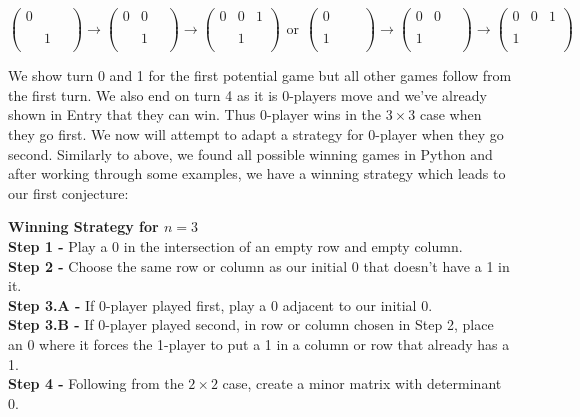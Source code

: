 \documentclass[11pt]{article}
\newcommand{\keywordfont}{\textsc}
\newcommand{\keyword}[1]{%
  \marginpar{\raggedright\small\keywordfont{#1}}}
\begin{document}
\[ \left( \begin{array}{ccc}
0 & \ & \ \\
\ & \ & \ \\
\ & 1 & \ \\
\end{array} \right)
\rightarrow
%
\left( \begin{array}{ccc}
0 & 0 & \ \\
\ & \ & \ \\
\ & 1 & \ \\
\end{array} \right)
\rightarrow
%
\left( \begin{array}{cc|c}
0 & 0 & 1 \\
\hline
\ & \ & \ \\
\ & 1 & \ \\
\end{array} \right)
\hspace{5pt} \text{or} \hspace{5pt}
%
\left( \begin{array}{ccc}
0 & \ & \ \\
\ & \ & \ \\
1 & \ & \ \\
\end{array} \right)
\rightarrow
%
\left( \begin{array}{ccc}
0 & 0 & \ \\
\ & \ & \ \\
1 & \ & \ \\
\end{array} \right)
\rightarrow
%
\left( \begin{array}{cc|c}
0 & 0 & 1 \\
\hline
\ & \ & \ \\
1 & \ & \ \\
\end{array} \right)
\]

We show turn 0 and 1 for the first potential game but all other games follow from the first turn. We also end on turn 4 as it is 0-players move and we've already shown in Entry that they can win. Thus 0-player wins in the $3 \times 3$ case when they go first. We now will attempt to adapt a strategy for 0-player when they go second. Similarly to above, we found all possible winning games in Python and after working through some examples, we have a winning strategy which leads to our first conjecture:

\textbf{Winning Strategy for $n = 3$} \keyword{Conjecture} \\
\textbf{Step 1 -} Play a 0 in the intersection of an empty row and empty column. \\
\textbf{Step 2 -} Choose the same row or column as our initial 0 that doesn't have a 1 in it.\\
\textbf{Step 3.A -} If 0-player played first, play a 0 adjacent to our initial 0.\\
\textbf{Step 3.B -} If 0-player played second, in row or column chosen in Step 2, place an 0 where it forces the 1-player to put a 1 in a column or row that already has a 1.\\
\textbf{Step 4 -} Following from the $2 \times 2$ case, create a minor matrix with determinant 0.
\end{document}

